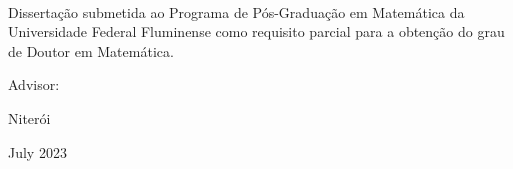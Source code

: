 {\sffamily\centering\Large

~\vspace{\fill}

{\huge\TITULO}

\vspace{3.5cm}

{\LARGE\AUTOR}

\vspace{3.5cm}

{\normalsize\raggedleft
\begin{minipage}{210pt}
Dissertação submetida ao Programa de Pós-Graduação
em Matemática da Universidade Federal Fluminense
como requisito parcial para a obtenção do grau de
Doutor em Matemática.
\end{minipage}
}

\vspace{3.5cm}

Advisor: \ORIENTADOR

\vspace{\fill}

{\large Niterói }


{\large  July 2023}


}

\clearpage

\thispagestyle{empty}

{\centering }

\clearpage

\thispagestyle{empty}

